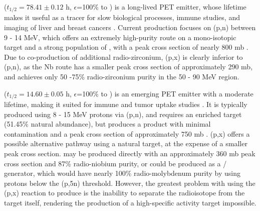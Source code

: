 \documentclass[3p]{elsarticle}
\begin{document}
 ($t_{1/2}=78.41\pm0.12$ h, $\epsilon$=100\% to   \cite{Singh2013}) is a long-lived PET emitter, whose  lifetime makes it useful as a tracer for slow biological processes, immune studies, and imaging of liver and  breast cancers \cite{Verel2003,Dijkers2009,Dijkers2010}.
Current production focuses on (p,n) between 9 - 14 MeV, which offers an extremely high-purity route on a mono-isotopic target and a strong population of , with a peak cross section of nearly 800 mb   \cite{PhysRevC.38.1624,Omara2009}.
Due to co-production of additional  radio-zirconium,  (p,x) is clearly inferior to  (p,n), as the Nb route has a smaller peak cross section of approximately 290 mb, and achieves only 50 -75\% radio-zirconium purity in the 50 - 90 MeV region.




 ($t_{1/2}=14.60 \pm 0.05$ h, $\epsilon$=100\% to   \cite{Browne1997}) is an emerging PET emitter with a moderate lifetime, making it suited for immune and tumor uptake studies    \cite{Busse2002,Radchenko2012}.
It is typically produced using 8 - 15 MeV protons via (p,n), and requires an enriched target (51.45\% natural abundance), but produces a product with minimal contamination and a peak cross section of approximately 750 mb  \cite{Busse2002}.
(p,x) offers a possible alternative pathway using a natural target, at the expense of a smaller peak cross section.
 may be produced directly with an approximately 360 mb peak cross section and 87\% radio-niobium purity, or could be produced as a / generator, which would have nearly 100\% radio-molybdenum purity by using protons below the (p,5n) threshold.
However, the greatest problem with using the (p,x) reaction to produce  is the inability to separate the radioisotope from the target itself, rendering the production of a high-specific activity target impossible.  
\end{document}
